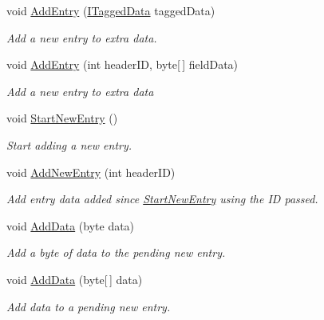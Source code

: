 \begin{DoxyCompactItemize}
void \hyperlink{class_i_c_sharp_code_1_1_sharp_zip_lib_1_1_zip_1_1_zip_extra_data_a86f3cb0b8dcd274f0bc84d75e06ba703}{Add\+Entry} (\hyperlink{interface_i_c_sharp_code_1_1_sharp_zip_lib_1_1_zip_1_1_i_tagged_data}{I\+Tagged\+Data} tagged\+Data)
\begin{DoxyCompactList}\small\item\em Add a new entry to extra data. \end{DoxyCompactList}\item 
void \hyperlink{class_i_c_sharp_code_1_1_sharp_zip_lib_1_1_zip_1_1_zip_extra_data_a7b8994c059c3b2ecf4cc7a6a60e592ff}{Add\+Entry} (int header\+ID, byte\mbox{[}$\,$\mbox{]} field\+Data)
\begin{DoxyCompactList}\small\item\em Add a new entry to extra data \end{DoxyCompactList}\item 
void \hyperlink{class_i_c_sharp_code_1_1_sharp_zip_lib_1_1_zip_1_1_zip_extra_data_a3fd5ac216b1b6a0fe5ae92ea8156f20a}{Start\+New\+Entry} ()
\begin{DoxyCompactList}\small\item\em Start adding a new entry. \end{DoxyCompactList}\item 
void \hyperlink{class_i_c_sharp_code_1_1_sharp_zip_lib_1_1_zip_1_1_zip_extra_data_aba673aeb5ed08038a5c76377c0607ca9}{Add\+New\+Entry} (int header\+ID)
\begin{DoxyCompactList}\small\item\em Add entry data added since \hyperlink{class_i_c_sharp_code_1_1_sharp_zip_lib_1_1_zip_1_1_zip_extra_data_a3fd5ac216b1b6a0fe5ae92ea8156f20a}{Start\+New\+Entry} using the ID passed. \end{DoxyCompactList}\item 
void \hyperlink{class_i_c_sharp_code_1_1_sharp_zip_lib_1_1_zip_1_1_zip_extra_data_a5a4382d76458422b6e5c9c353430eaa8}{Add\+Data} (byte data)
\begin{DoxyCompactList}\small\item\em Add a byte of data to the pending new entry. \end{DoxyCompactList}\item 
void \hyperlink{class_i_c_sharp_code_1_1_sharp_zip_lib_1_1_zip_1_1_zip_extra_data_aadf236a3ef6fc9c6a033ca14f931734c}{Add\+Data} (byte\mbox{[}$\,$\mbox{]} data)
\begin{DoxyCompactList}\small\item\em Add data to a pending new entry. \end{DoxyCompactList}\item 

\end{DoxyCompactItemize}
